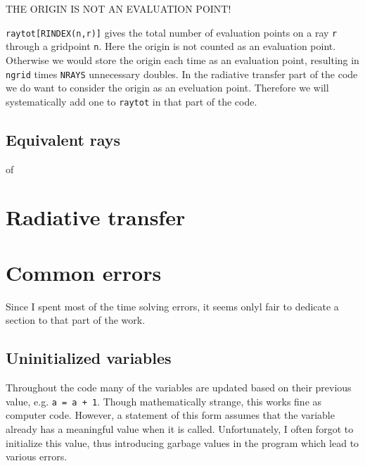 \documentclass[]{article}
\begin{document}
THE ORIGIN IS NOT AN EVALUATION POINT!

\texttt{raytot[RINDEX(n,r)]} gives the total number of evaluation points on a ray \texttt{r} through a gridpoint \texttt{n}. Here the origin is not counted as an evaluation point. Otherwise we would store the origin each time as an evaluation point, resulting in \texttt{ngrid} times \texttt{NRAYS} unnecessary doubles. In the radiative transfer part of the code we do want to consider the origin as an eveluation point. Therefore we will systematically add one to \texttt{raytot} in that part of the code.

\subsection{Equivalent rays}
of

\section{Radiative transfer}


\section{Common errors}

Since I spent most of the time solving errors, it seems onlyl fair to dedicate a section to that part of the work.

\subsection{Uninitialized variables}

Throughout the code many of the variables are updated based on their previous value, e.g. \texttt{a = a + 1}. Though mathematically strange, this works fine as computer code. However, a statement of this form assumes that the variable already has a meaningful value when it is called. Unfortunately, I often forgot to initialize this value, thus introducing garbage values in the program which lead to various errors.
\end{document}
